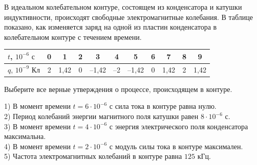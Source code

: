 \begin{taskbasic}[code={\label{task:elem_osc_v3_n14}}]
В идеальном колебательном контуре, состоящем из конденсатора и катушки индуктивности, происходят свободные электромагнитные колебания. В таблице показано, как изменяется заряд на одной из пластин конденсатора в колебательном контуре с течением времени.

\nopagebreak\smallskip
\begin{center}
\small
\begin{tabular}{|l|c|c|c|c|c|c|c|c|c|c|}
\hline
$t$, $10^{-6}\text{ с}$ & 0 & 1 & 2 & 3 & 4 & 5 & 6 & 7 & 8 & 9 \\ \hline
$q$, $10^{-9}\text{ Кл}$ & 2 & 1,42 & 0 & --1,42 & --2 & --1,42 & 0 & 1,42 & 2 & 1,42 \\ \hline
\end{tabular}
\end{center}
\smallskip

Выберите все верные утверждения о процессе, происходящем в контуре.

1) В момент времени $t = 6\cdot 10^{-6}\text{ с}$ сила тока в контуре равна нулю.\\
2) Период колебаний энергии магнитного поля катушки равен $8\cdot 10^{-6}\text{ с}$.\\
3) В момент времени $t = 4\cdot 10^{-6}\text{ с}$ энергия электрического поля конденсатора максимальна.\\
4) В момент времени $t = 2\cdot 10^{-6}\text{ с}$ модуль силы тока в контуре максимален.\\
5) Частота электромагнитных колебаний в контуре равна $125\text{ кГц}$.

\end{taskbasic}

